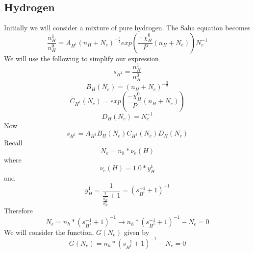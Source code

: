 \documentclass{article}
\begin{document}
		\subsection{Hydrogen}
			Initially we will consider a mixture of pure hydrogen. The Saha equation becomes
			\begin{equation} \label{eq:saha_pressure_revised_hydrogen}
				\frac{n^1_H}{n^0_H} = A_{H^{1}} \left( n_H + N_e \right)^{-\frac{3}{2}}
					exp\left(\frac{-\chi^0_H}{P} \left(n_H + N_e \right)\right) N_e^{-1}
			\end{equation}
			We will use the following to simplify our expression
			\begin{equation} \label{eq:saha_pressure_s_H1}
				s_{H^1} = \frac{n^1_H}{n^0_H}
			\end{equation}
			\begin{equation} \label{eq:saha_pressure_B_H_Ne}
				B_H(N_e) = (n_H + N_e)^{-\frac{3}{2}}
			\end{equation}
			\begin{equation} \label{eq:saha_pressure_C_H1_Ne}
				C_{H^1}(N_e) = exp\left(\frac{-\chi^0_H}{P} \left(n_H + N_e \right)\right) 
			\end{equation}
			\begin{equation} \label{eq:saha_pressure_D_H_Ne}
				D_H(N_e) = N_e^{-1}
			\end{equation}
			Now
			\begin{equation} \label{eq:saha_pressure_constants_hydrogen}
				s_{H^1} = A_{H^{1}} B_H(N_e) C_{H^1}(N_e) D_H(N_e)
			\end{equation}
			Recall
			\begin{equation} \label{eq:N_e_hydrogen}
				N_{e} = n_h * \nu_e(H)
			\end{equation}
			where
			\begin{equation} \label{eq:v_e_hydrogen}
				\nu_e(H) = 1.0 * y_H^1
			\end{equation}
			and 
			\begin{equation} \label{eq:ratio_H^1} 
				y_H^1 = \frac{1}{\frac{1}{\frac{n_H^1}{n_H^0}}+1} = 
						\left( s_{H^1}^{-1} + 1 \right)^{-1}
			\end{equation}
			Therefore
			\begin{equation} \label{eq:N_e_ratio_H^1_hydrogen}
				N_{e} = n_h * \left( s_{H^1}^{-1} + 1 \right)^{-1} \rightarrow
				n_h * \left( s_{H^1}^{-1} + 1 \right)^{-1} - N_e = 0
			\end{equation}
			We will consider the function, $G(N_e)$ given by
			\begin{equation} \label{eq:G(N_e)_hydrogen}
				G(N_e) = n_h * \left( s_{H^1}^{-1} + 1 \right)^{-1} - N_e = 0
			\end{equation}
\end{document}
